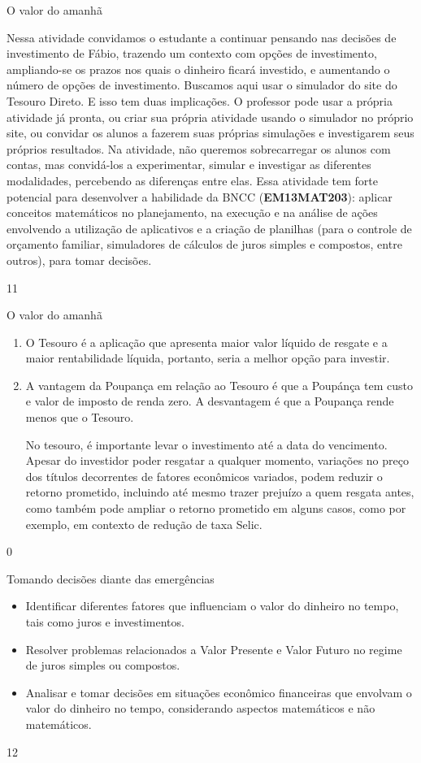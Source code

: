 \marginpar{\vspace{-2.5em}}
\begin{sugestions}{O valor do amanhã}
{
Nessa atividade convidamos o estudante a continuar pensando nas decisões de investimento de Fábio, trazendo um contexto com opções de investimento, ampliando-se os prazos nos quais o dinheiro ficará investido, e aumentando o número de opções de investimento.
Buscamos aqui usar o simulador do site do Tesouro Direto. E isso tem duas implicações. O professor pode usar a própria atividade já pronta, ou criar sua própria atividade usando o simulador no próprio site, ou convidar os alunos a fazerem suas próprias simulações e investigarem seus próprios resultados.
Na atividade, não queremos sobrecarregar os alunos com contas, mas convidá-los a experimentar, simular e investigar as diferentes modalidades, percebendo as diferenças entre elas.
Essa atividade tem forte potencial para desenvolver a habilidade da BNCC (\textbf{EM13MAT203}): aplicar conceitos matemáticos no planejamento, na execução e na análise de ações envolvendo a utilização de aplicativos e a criação de planilhas (para o controle de orçamento familiar, simuladores de cálculos de juros simples e compostos, entre outros), para tomar decisões.

}{1}{1}
\end{sugestions}
\begin{answer}{O valor do amanhã}
{
  \begin{enumerate}
    \item O Tesouro é a aplicação que apresenta maior valor líquido de resgate e a maior rentabilidade líquida, portanto, seria a melhor opção para investir.
    \item A vantagem da Poupança em relação ao Tesouro é que a Poupánça tem custo e valor de imposto de renda zero. A desvantagem é que a Poupança rende menos que o Tesouro.

    No tesouro, é importante levar o investimento até a data do vencimento. Apesar do investidor poder resgatar a qualquer momento, variações no preço dos títulos decorrentes de fatores econômicos variados, podem reduzir o retorno prometido, incluindo até mesmo trazer prejuízo a quem resgata antes, como também pode ampliar o retorno prometido em alguns casos, como por exemplo, em contexto de redução de taxa Selic. 
  \end{enumerate}
}{0}
\end{answer}
\clearmargin
\begin{objectives}{Tomando decisões diante das emergências}
{
\begin{itemize}
\item Identificar diferentes fatores que influenciam o valor do dinheiro no tempo, tais como juros e investimentos.
\item Resolver problemas relacionados a Valor Presente e Valor Futuro no regime de juros simples ou compostos.
\item Analisar e tomar decisões em situações econômico financeiras que envolvam o valor do dinheiro no tempo, considerando aspectos matemáticos e não matemáticos.
\end{itemize}
}{1}{2}
\end{objectives}
